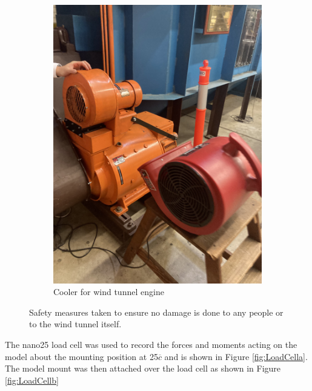 \begin{figure}[H]
\begin{subfigure}[b]{0.45\textwidth}
                \includegraphics[scale=0.05]{04_Methodology/Figs/cooler.jpg}
                \caption{Cooler for wind tunnel engine}
                \label{fig:engineCooler}
     \end{subfigure}
     \caption{Safety measures taken to ensure no damage is done to any people or to the wind tunnel itself.}
     \label{fig:windTunnelSafety}
\end{figure}


The nano25 load cell was used to record the forces and moments acting on the model about the mounting position at 25$\overline{c}$ and is shown in Figure \ref{fig:LoadCella}. The model mount was then attached over the load cell as shown in Figure \ref{fig:LoadCellb}

